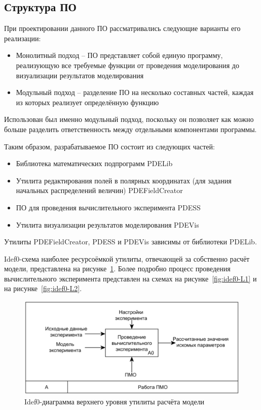 \subsection{Структура ПО}
При проектировании данного ПО рассматривались следующие варианты его реализации:
\begin{itemize}
    \item Монолитный подход -- ПО представляет собой единую программу, 
    реализующую все требуемые функции от проведения моделирования до 
    визуализации результатов моделирования
    \item Модульный подход -- разделение ПО на несколько составных частей, 
    каждая из которых реализует определённую функцию
\end{itemize}
Использован был именно модульный подход, поскольку он позволяет как можно 
больше разделить ответственность между отдельными компонентами программы.

Таким образом, разрабатываемое ПО состоит из следующих частей:
\begin{itemize}
    \item Библиотека математических подпрограмм PDELib
    \item Утилита редактирования полей в полярных координатах (для задания 
    начальных распределений величин) PDEFieldCreator
    \item ПО для проведения вычислительного эксперимента PDESS
    \item Утилита визуализации результатов моделирования PDEVis
\end{itemize}

Утилиты PDEFieldCreator, PDESS и PDEVis зависимы от библиотеки PDELib.

Idef0-схема наиболее ресурсоёмкой утилиты, отвечающей за собственно расчёт 
модели, представлена на рисунке~\ref{fig:idef0-top}. Более подробно процесс 
проведения вычислительного эксперимента представлен на схемах на 
рисунке~\ref{fig:idef0-L1} и на рисунке~\ref{fig:idef0-L2}.

\begin{figure}
    \centering
    \includegraphics[width=.7\textwidth]{img/idef0/top}
    \caption{Idef0-диаграмма верхнего уровня утилиты расчёта модели}
    \label{fig:idef0-top}
\end{figure}

